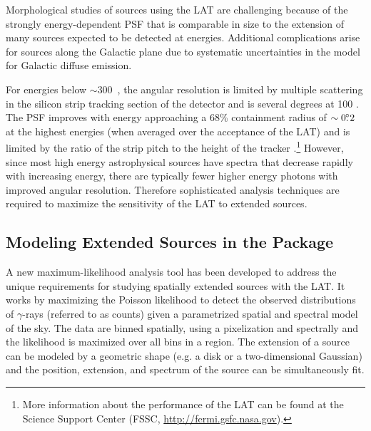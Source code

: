 Morphological studies of sources using the LAT are challenging
because of the strongly energy-dependent PSF that is comparable in
size to the extension of many sources expected to be detected at
\gev energies.  Additional complications arise for sources along
the Galactic plane due to systematic uncertainties in the model for
Galactic diffuse emission.  

For energies below $\sim$300~\mev, the angular resolution is limited by
multiple scattering in the silicon strip tracking section
of the detector and is several degrees at 100 \mev.  The PSF improves
with energy approaching a 68\% containment radius of $\sim0\mbox{$.\!\!^\circ$}2$ at
the highest energies (when averaged over the acceptance of the LAT)
and is limited by the ratio of the strip pitch to the height of the tracker
\citep{atwood_2009a_large-telescope,abdo_2009a_on-orbit-calibration,ackermann_2012a_fermi-large}.\footnote{More
information about the performance of the LAT can be found at the \fermi
Science Support Center (FSSC, \url{http://fermi.gsfc.nasa.gov}).} However,
since most high energy astrophysical sources have spectra that decrease
rapidly with increasing energy, there are typically fewer higher
energy photons with improved angular resolution. Therefore sophisticated
analysis techniques are required to maximize the sensitivity of the LAT
to extended sources.

\subsection{Modeling Extended Sources in the \pointlike Package}

A new maximum-likelihood analysis tool has been developed to address the
unique requirements for studying spatially extended sources with the LAT.
It works by maximizing the Poisson 
likelihood to detect the observed distributions of $\gamma$-rays (referred to as counts)
given a parametrized spatial and spectral model of the sky.  
The data are binned spatially, using a \healpix pixelization and spectrally 
\citep{gorski_2005_healpix:-framework} and the likelihood is maximized over all bins in
a region.
The extension of a source can be modeled by a geometric shape
(e.g. a disk or a two-dimensional Gaussian) and the position, extension,
and spectrum of the source can be simultaneously fit.

